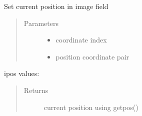 \documentclass[letterpaper,10pt,english]{sphinxmanual}
\begin{document}
\begin{fulllineitems}
\label{\detokenize{images_functions:images.setpos}}
Set current position in image field
\begin{quote}\begin{description}
\item[{Parameters}] \leavevmode\begin{itemize}
\item {} 
 \textendash{} coordinate index

\item {} 
 \textendash{} position coordinate pair

\end{itemize}

\end{description}\end{quote}
\begin{description}
\item[{ipos values:}] \leavevmode
{}

\end{description}
\begin{quote}\begin{description}
\item[{Returns}] \leavevmode
current position using getpos()

\end{description}\end{quote}

\end{fulllineitems}

\end{document}
